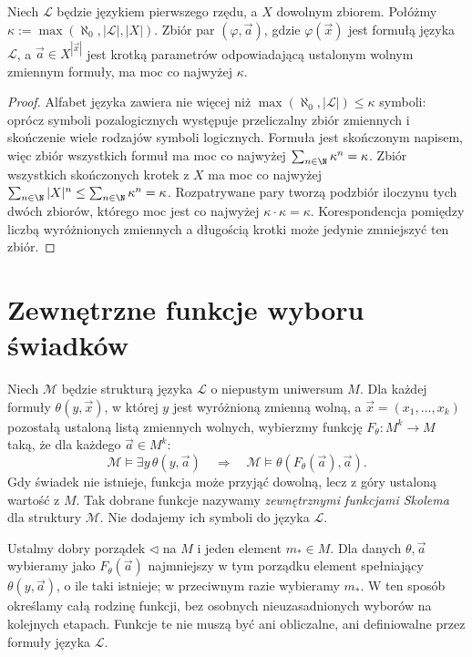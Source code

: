 \begin{lemat}
\label{lem:ls-formula-count}
Niech $\mathcal L$ będzie językiem pierwszego rzędu,
a $X$ dowolnym zbiorem. Połóżmy
$\kappa:=\max(\aleph_0,|\mathcal L|,|X|)$.
Zbiór par $(\varphi,\vec a)$, gdzie
$\varphi(\vec x)$ jest formułą języka $\mathcal L$,
a $\vec a\in X^{|\vec x|}$ jest krotką parametrów
odpowiadającą ustalonym wolnym zmiennym formuły,
ma moc co najwyżej $\kappa$.
\end{lemat}
\begin{proof}
Alfabet języka zawiera nie więcej niż
$\max(\aleph_0,|\mathcal L|)\le\kappa$
symboli: oprócz symboli pozalogicznych
występuje przeliczalny zbiór zmiennych
i skończenie wiele rodzajów symboli logicznych.
Formuła jest skończonym napisem, więc
zbiór wszystkich formuł ma moc co najwyżej
$\sum_{n\in\N}\kappa^n=\kappa$.
Zbiór wszystkich skończonych krotek z $X$
ma moc co najwyżej
$\sum_{n\in\N}|X|^n\le\sum_{n\in\N}\kappa^n=\kappa$.
Rozpatrywane pary tworzą podzbiór iloczynu
tych dwóch zbiorów, którego moc jest
co najwyżej $\kappa\cdot\kappa=\kappa$.
Korespondencja pomiędzy liczbą wyróżnionych
zmiennych a długością krotki może jedynie
zmniejszyć ten zbiór.
\end{proof}

\section{Zewnętrzne funkcje wyboru świadków}
\begin{definicja}
\label{def:ls-skolem-functions}
Niech $\mathcal M$ będzie strukturą języka
$\mathcal L$ o niepustym uniwersum $M$.
Dla każdej formuły $\theta(y,\vec x)$, w której
$y$ jest wyróżnioną zmienną wolną,
a $\vec x=(x_1,\ldots,x_k)$ pozostałą
ustaloną listą zmiennych wolnych, wybierzmy funkcję
$F_\theta:M^k\to M$ taką, że dla każdego
$\vec a\in M^k$:
\[
\mathcal M\models\exists y\,\theta(y,\vec a)
\quad\Longrightarrow\quad
\mathcal M\models\theta(F_\theta(\vec a),\vec a).
\]
Gdy świadek nie istnieje, funkcja może przyjąć
dowolną, lecz z góry ustaloną wartość z $M$.
Tak dobrane funkcje nazywamy
\emph{zewnętrznymi funkcjami Skolema}
dla struktury $\mathcal M$.
Nie dodajemy ich symboli do języka $\mathcal L$.
\end{definicja}

\begin{uwaga}
\label{rem:ls-choice}
Ustalmy dobry porządek $\triangleleft$ na $M$
i jeden element $m_*\in M$.
Dla danych $\theta,\vec a$ wybieramy jako
$F_\theta(\vec a)$ najmniejszy w tym porządku
element spełniający $\theta(y,\vec a)$,
o ile taki istnieje; w przeciwnym razie
wybieramy $m_*$. W ten sposób określamy całą
rodzinę funkcji, bez osobnych nieuzasadnionych
wyborów na kolejnych etapach.
Funkcje te nie muszą być ani obliczalne,
ani definiowalne przez formuły języka $\mathcal L$.
\end{uwaga}

